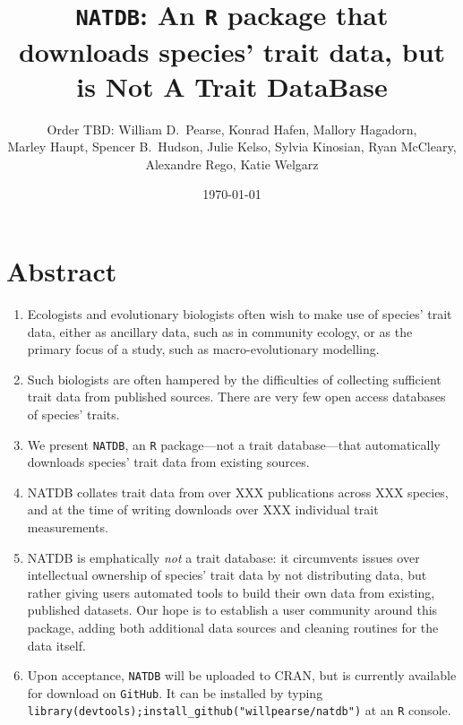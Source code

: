 \documentclass[12pt]{report}
\newcommand{\GitHub}{\texttt{GitHub}\xspace}
\newcommand{\R}{\texttt{R}\xspace}
\newcommand{\natdb}{\texttt{NATDB}\xspace}
\begin{document}
\title{\natdb : An \R package that downloads species' trait data, but
  is Not A Trait DataBase} \author{Order TBD: William D.\ Pearse,
  Konrad Hafen, Mallory Hagadorn,\\ Marley Haupt, Spencer B.\ Hudson,
  Julie Kelso, Sylvia Kinosian, Ryan McCleary,\\ Alexandre Rego, Katie
  Welgarz} \date{\today}
\maketitle

\section{Abstract}
\begin{enumerate}
\item Ecologists and evolutionary biologists often wish to make use of
  species' trait data, either as ancillary data, such as in community
  ecology, or as the primary focus of a study, such as
  macro-evolutionary modelling.
\item Such biologists are often hampered by the difficulties of
  collecting sufficient trait data from published sources. There are
  very few open access databases of species' traits.
\item We present \natdb, an \R package---not a trait database---that
  automatically downloads species' trait data from existing sources.
\item NATDB collates trait data from over XXX publications across XXX
  species, and at the time of writing downloads over XXX individual
  trait measurements.
\item NATDB is emphatically \emph{not} a trait database: it
  circumvents issues over intellectual ownership of species' trait
  data by not distributing data, but rather giving users automated
  tools to build their own data from existing, published datasets. Our
  hope is to establish a user community around this package, adding
  both additional data sources and cleaning routines for the data
  itself.
\item Upon acceptance, \natdb will be uploaded to CRAN, but is
  currently available for download on \GitHub. It can be installed by
  typing
  \texttt{library(devtools);install\_github("willpearse/natdb")} at an
  \R console.
\end{enumerate}
\end{document}
